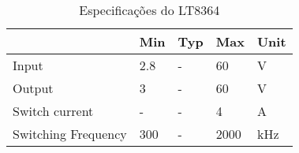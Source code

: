 \begin{table}
\centering
\caption{Especificações do LT8364}
\label{lt8364_specs_table}
\begin{tabular}{|l|l|l|l|l|} 
\cline{2-5}
\multicolumn{1}{c|}{} & \multicolumn{1}{c|}{Min} & \multicolumn{1}{c|}{Typ} & \multicolumn{1}{c|}{Max} & Unit  \\ 
\hline
Input                 & 2.8                      & -                        & 60                      & V     \\ 
\hline
Output                & 3                        & -                        & 60                      & V   \\ 
\hline
Switch current                & -                        & -                        & 4                      & A   \\ 
\hline
Switching Frequency   & 300                   & -                      & 2000                        & kHz   \\
\hline
\end{tabular}
\end{table}